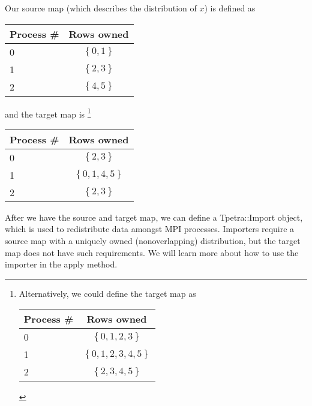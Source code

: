 \documentclass[pdf,12pt,report,strict]{SANDreport}
\begin{document}
Our source map (which describes the distribution of $x$) is defined as

\begin{center}
\begin{tabular}{|l|c|}
\hline
Process \# & Rows owned \\
\hline \hline
0 & $\left\{0,1\right\}$ \\
1 & $\left\{2,3\right\}$ \\
2 & $\left\{4,5\right\}$ \\
\hline
\end{tabular}
\end{center}

and the target map is 
\footnote{Alternatively, we could define the target map as

\begin{center}
\begin{tabular}{|l|c|}
\hline
Process \# & Rows owned \\
\hline \hline
0 & $\left\{0,1,2,3\right\}$ \\
1 & $\left\{0,1,2,3,4,5\right\}$ \\
2 & $\left\{2,3,4,5\right\}$ \\
\hline
\end{tabular}
\end{center}
}
\begin{center}
\begin{tabular}{|l|c|}
\hline
Process \# & Rows owned \\
\hline \hline
0 & $\left\{2,3\right\}$ \\
1 & $\left\{0,1,4,5\right\}$ \\
2 & $\left\{2,3\right\}$ \\
\hline
\end{tabular}
\end{center}

After we have the source and target map, we can define a Tpetra::Import object,
which is used to redistribute data amongst MPI processes.
Importers require a source map with a uniquely owned (nonoverlapping)
distribution, but the target map does not have such requirements.
We will learn more about how to use the importer in the apply method.
\end{document}
